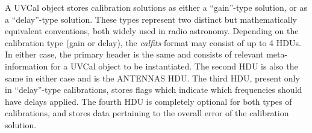 \documentclass[11pt, oneside, english]{article}   	%
\begin{document}
A UVCal object stores calibration solutions as either a ``gain''-type solution, or as a ``delay''-type solution.
These types represent two distinct but mathematically equivalent conventions, both widely used in radio astronomy.
Depending on the calibration type (gain or delay), the \textit{calfits} format may consist of up to 4 HDUs. 
In either case, the primary header is the same and consists of relevant meta-information for a UVCal object to be instantiated.
The second HDU is also the same in either case and is the ANTENNAS HDU. 
The third HDU, present only in ``delay''-type calibrations, stores flags which indicate which frequencies should have delays applied.
The fourth HDU is completely optional for both types of calibrations, and stores data pertaining to the overall error of the calibration solution.

%
%
\end{document}
